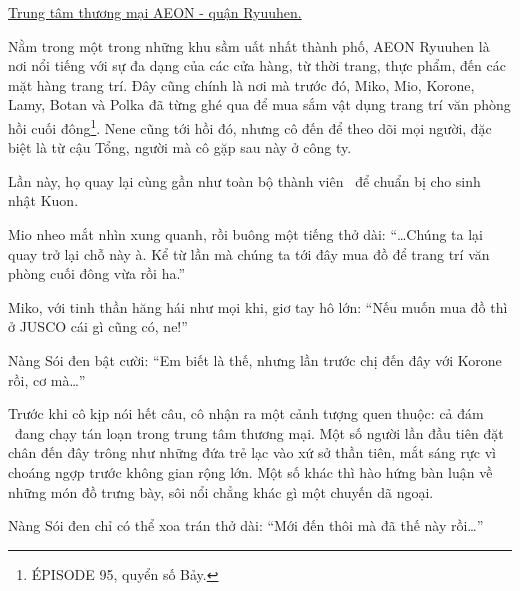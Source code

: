 \documentclass[../main.tex]{subfiles}
\begin{document}
\color{black}


\begin{center}
    \uline{Trung tâm thương mại AEON - quận Ryuuhen.}
\end{center}

Nằm trong một trong những khu sầm uất nhất thành phố, AEON Ryuuhen là nơi nổi tiếng với sự đa dạng của các cửa hàng, từ thời trang, thực phẩm, đến các mặt hàng trang trí. Đây cũng chính là nơi mà trước đó, Miko, Mio, Korone, Lamy, Botan và Polka đã từng ghé qua để mua sắm vật dụng trang trí văn phòng hồi cuối đông\footnote{{\flaregothic ÉPISODE 95}, quyển số Bảy.}. Nene cũng tới hồi đó, nhưng cô đến để theo dõi mọi người, đặc biệt là từ cậu Tổng, người mà cô gặp sau này ở công ty.

Lần này, họ quay lại cùng gần như toàn bộ thành viên \hll\ để chuẩn bị cho sinh nhật Kuon.

Mio nheo mắt nhìn xung quanh, rồi buông một tiếng thở dài: ``\dots Chúng ta lại quay trở lại chỗ này à. Kể từ lần mà chúng ta tới đây mua đồ để trang trí văn phòng cuối đông vừa rồi ha.''

Miko, với tinh thần hăng hái như mọi khi, giơ tay hô lớn: ``Nếu muốn mua đồ thì ở JUSCO cái gì cũng có, ne!''

Nàng Sói đen bật cười: ``Em biết là thế, nhưng lần trước chị đến đây với Korone rồi, cơ mà\dots''

Trước khi cô kịp nói hết câu, cô nhận ra một cảnh tượng quen thuộc: cả đám \hll\ đang chạy tán loạn trong trung tâm thương mại. Một số người lần đầu tiên đặt chân đến đây trông như những đứa trẻ lạc vào xứ sở thần tiên, mắt sáng rực vì choáng ngợp trước không gian rộng lớn. Một số khác thì hào hứng bàn luận về những món đồ trưng bày, sôi nổi chẳng khác gì một chuyến dã ngoại.

Nàng Sói đen chỉ có thể xoa trán thở dài: ``Mới đến thôi mà đã thế này rồi\dots''
\end{document}
